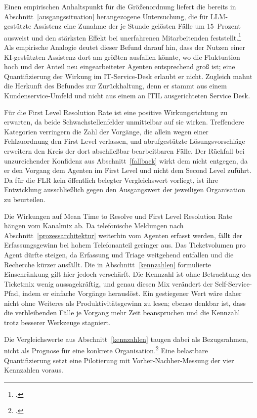 Einen empirischen Anhaltspunkt f\"ur die Gr\"o{\ss}enordnung liefert die bereits in Abschnitt~\ref{ausgangssituation} herangezogene Untersuchung, die f\"ur LLM-gest\"utzte Assistenz eine Zunahme der je Stunde gel\"osten F\"alle um 15~Prozent ausweist und den st\"arksten Effekt bei unerfahrenen Mitarbeitenden feststellt.\footcite[Vgl.][S.~890]{Brynjolfsson2025} Als empirische Analogie deutet dieser Befund darauf hin, dass der Nutzen einer KI-gest\"utzten Assistenz dort am gr\"o{\ss}ten ausfallen k\"onnte, wo die Fluktuation hoch und der Anteil neu eingearbeiteter Agenten entsprechend gro{\ss} ist; eine Quantifizierung der Wirkung im IT-Service-Desk erlaubt er nicht. Zugleich mahnt die Herkunft des Befundes zur Zur\"uckhaltung, denn er stammt aus einem Kundenservice-Umfeld und nicht aus einem an ITIL ausgerichteten Service Desk.

F\"ur die First Level Resolution Rate ist eine positive Wirkungsrichtung zu erwarten, da beide Schwachstellenfelder unmittelbar auf sie wirken. Treffendere Kategorien verringern die Zahl der Vorg\"ange, die allein wegen einer Fehlzuordnung den First Level verlassen, und abrufgest\"utzte L\"osungsvorschl\"age erweitern den Kreis der dort abschlie{\ss}bar bearbeitbaren F\"alle. Der R\"uckfall bei unzureichender Konfidenz aus Abschnitt~\ref{fallback} wirkt dem nicht entgegen, da er den Vorgang dem Agenten im First Level und nicht dem Second Level zuf\"uhrt. Da f\"ur die FLR kein \"offentlich belegter Vergleichswert vorliegt, ist ihre Entwicklung ausschlie{\ss}lich gegen den Ausgangswert der jeweiligen Organisation zu beurteilen.

Die Wirkungen auf Mean Time to Resolve und First Level Resolution Rate h\"angen vom Kanalmix ab. Da telefonische Meldungen nach Abschnitt~\ref{prozessarchitektur} weiterhin vom Agenten erfasst werden, f\"allt der Erfassungsgewinn bei hohem Telefonanteil geringer aus. Das Ticketvolumen pro Agent d\"urfte steigen, da Erfassung und Triage weitgehend entfallen und die Recherche k\"urzer ausf\"allt. Die in Abschnitt~\ref{kennzahlen} formulierte Einschr\"ankung gilt hier jedoch versch\"arft. Die Kennzahl ist ohne Betrachtung des Ticketmix wenig aussagekr\"aftig, und genau diesen Mix ver\"andert der Self-Service-Pfad, indem er einfache Vorg\"ange herausl\"ost. Ein gestiegener Wert w\"are daher nicht ohne Weiteres als Produktivit\"atsgewinn zu lesen; ebenso denkbar ist, dass die verbleibenden F\"alle je Vorgang mehr Zeit beanspruchen und die Kennzahl trotz besserer Werkzeuge stagniert.

Die Vergleichswerte aus Abschnitt~\ref{kennzahlen} taugen dabei als Bezugsrahmen, nicht als Prognose f\"ur eine konkrete Organisation.\footcites[Vgl.][S.~5]{Rumburg2011}[][o.~S.]{Rumburg2018} Eine belastbare Quantifizierung setzt eine Pilotierung mit Vorher-Nachher-Messung der vier Kennzahlen voraus.

